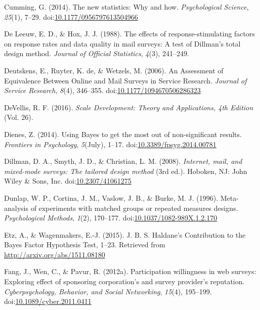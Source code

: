 \documentclass[english,man, mask]{apa6}
\theoremstyle{definition}
\theoremstyle{definition}
\theoremstyle{definition}
\theoremstyle{remark}
\begin{document}
\hypertarget{ref-Cumming2014}{}
Cumming, G. (2014). The new statistics: Why and how. \emph{Psychological
Science}, \emph{25}(1), 7--29.
doi:\href{https://doi.org/10.1177/0956797613504966}{10.1177/0956797613504966}

\hypertarget{ref-DeLeeuw1988}{}
De Leeuw, E. D., \& Hox, J. J. (1988). The effects of
response-stimulating factors on response rates and data quality in mail
surveys: A test of Dillman's total design method. \emph{Journal of
Official Statistics}, \emph{4}(3), 241--249.

\hypertarget{ref-Deutskens2006}{}
Deutskens, E., Ruyter, K. de, \& Wetzels, M. (2006). An Assessment of
Equivalence Between Online and Mail Surveys in Service Research.
\emph{Journal of Service Research}, \emph{8}(4), 346--355.
doi:\href{https://doi.org/10.1177/1094670506286323}{10.1177/1094670506286323}

\hypertarget{ref-DeVellis2016a}{}
DeVellis, R. F. (2016). \emph{Scale Development: Theory and
Applications, 4th Edition} (Vol. 26).

\hypertarget{ref-Dienes2014}{}
Dienes, Z. (2014). Using Bayes to get the most out of non-significant
results. \emph{Frontiers in Psychology}, \emph{5}(July), 1--17.
doi:\href{https://doi.org/10.3389/fpsyg.2014.00781}{10.3389/fpsyg.2014.00781}

\hypertarget{ref-Dillman2008}{}
Dillman, D. A., Smyth, J. D., \& Christian, L. M. (2008).
\emph{Internet, mail, and mixed-mode surveys: The tailored design
method} (3rd ed.). Hoboken, NJ: John Wiley \& Sons, Inc.
doi:\href{https://doi.org/10.2307/41061275}{10.2307/41061275}

\hypertarget{ref-Dunlap1996a}{}
Dunlap, W. P., Cortina, J. M., Vaslow, J. B., \& Burke, M. J. (1996).
Meta-analysis of experiments with matched groups or repeated measures
designs. \emph{Psychological Methods}, \emph{1}(2), 170--177.
doi:\href{https://doi.org/10.1037/1082-989X.1.2.170}{10.1037/1082-989X.1.2.170}

\hypertarget{ref-Etz2015}{}
Etz, A., \& Wagenmakers, E.-J. (2015). J. B. S. Haldane's Contribution
to the Bayes Factor Hypothesis Test, 1--23. Retrieved from
\url{http://arxiv.org/abs/1511.08180}

\hypertarget{ref-Fang2012a}{}
Fang, J., Wen, C., \& Pavur, R. (2012a). Participation willingness in
web surveys: Exploring effect of sponsoring corporation's and survey
provider's reputation. \emph{Cyberpsychology, Behavior, and Social
Networking}, \emph{15}(4), 195--199.
doi:\href{https://doi.org/10.1089/cyber.2011.0411}{10.1089/cyber.2011.0411}
\end{document}
